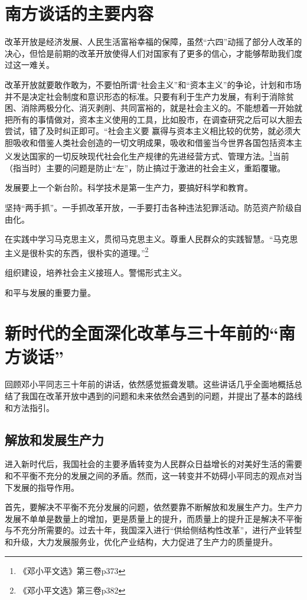 \documentclass[12pt]{article}
\begin{document}
\section{南方谈话的主要内容}
改革开放是经济发展、人民生活富裕幸福的保障，虽然“六四”动摇了部分人改革的决心，但恰是前期的改革开放使得人们对国家有了更多的信心，才能够帮助我们度过这一难关。

改革开放就要敢作敢为，不要怕所谓“社会主义”和“资本主义”的争论，计划和市场并不是决定社会制度和意识形态的标准。只要有利于生产力发展，有利于消除贫困、消除两极分化、消灭剥削、共同富裕的，就是社会主义的。不能想着一开始就把所有的事情做对，资本主义使用的工具，比如股市，在调查研究之后可以大胆去尝试，错了及时纠正即可。“社会主义要 赢得与资本主义相比较的优势，就必须大胆吸收和借鉴人类社会创造的一切文明成果，吸收和借鉴当今世界各国包括资本主义发达国家的一切反映现代社会化生产规律的先进经营方式、管理方法。\footnote{《邓小平文选》第三卷p373}当前（指当时）主要的问题是防止“左”，防止搞过于激进的社会主义，重蹈覆辙。

发展要上一个新台阶。科学技术是第一生产力，要搞好科学和教育。

坚持“两手抓”。一手抓改革开放，一手要打击各种违法犯罪活动。防范资产阶级自由化。

在实践中学习马克思主义，贯彻马克思主义。尊重人民群众的实践智慧。“马克思主义是很朴实的东西，很朴实的道理。”\footnote{《邓小平文选》第三卷p382}

组织建设，培养社会主义接班人。警惕形式主义。

和平与发展的重要力量。

\section{新时代的全面深化改革与三十年前的“南方谈话”}
回顾邓小平同志三十年前的讲话，依然感觉振聋发聩。这些讲话几乎全面地概括总结了我国在改革开放中遇到的问题和未来依然会遇到的问题，并提出了基本的路线和方法指引。

\subsection{解放和发展生产力}
进入新时代后，我国社会的主要矛盾转变为人民群众日益增长的对美好生活的需要和不平衡不充分的发展之间的矛盾。然而，这一转变并不妨碍小平同志的观点对当下发展的指导作用。

首先，要解决不平衡不充分发展的问题，依然要靠不断解放和发展生产力。生产力发展不单单是数量上的增加，更是质量上的提升，而质量上的提升正是解决不平衡与不充分所需要的。过去十年，我国深入进行“供给侧结构性改革”，进行产业转型和升级，大力发展服务业，优化产业结构，大力促进了生产力的质量提升。
\end{document}
